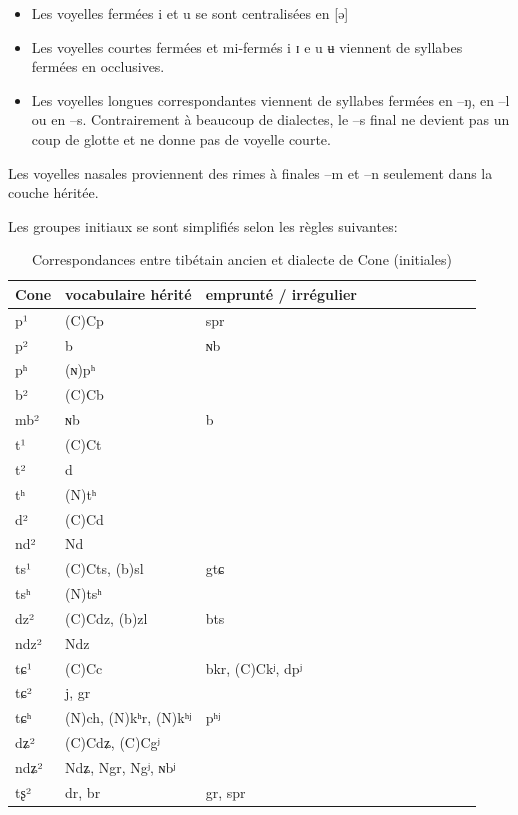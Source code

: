 \documentclass[oldfontcommands,oneside,a4paper,11pt]{memoir}
\begin{document}
\begin{itemize}
\item Les voyelles fermées i et u se sont centralisées en [ə]
\item Les voyelles courtes fermées et mi-fermés i ɪ e u ʉ viennent de syllabes fermées en occlusives. 
\item Les voyelles longues correspondantes viennent de syllabes fermées en --ŋ, en --l ou en --s. Contrairement à beaucoup de dialectes, le --s final ne devient pas un coup de glotte et ne donne pas de voyelle courte.
\end{itemize}
Les voyelles nasales proviennent des rimes à finales --m et --n seulement dans la couche héritée.

Les groupes initiaux se sont simplifiés selon les règles suivantes:

\begin{longtable}{l|llllllllll} 
\caption{Correspondances entre tibétain ancien et dialecte de Cone (initiales)}\label{tab:cone3} \\
\toprule
Cone  &  	vocabulaire hérité  &  	emprunté / irrégulier  \\  
\midrule
p¹  &  	(C)Cp  &  	spr  \\  
p²  &  	b  &  	ɴb  \\  
pʰ  &  	(ɴ)pʰ  &  	   \\  
b²  &  	(C)Cb  &  	   \\  
mb²  &  	ɴb  &  	b  \\  
t¹  &  	(C)Ct  &  	   \\  
t²  &  	d  &  	   \\  
tʰ  &  	(N)tʰ  &  	   \\  
d²  &  	(C)Cd  &  	   \\  
nd²  &  	Nd  &  	   \\  
ts¹  &  	(C)Cts, (b)sl  &  	gtɕ  \\  
tsʰ  &  	(N)tsʰ  &  	   \\  
dz²  &  	(C)Cdz, (b)zl  &  	bts  \\  
ndz²  &  	Ndz  &  	   \\  
tɕ¹  &  	(C)Cc  &  	bkr, (C)Ckʲ, dpʲ  \\  
tɕ²  &  	j, gr  &  	   \\  
tɕʰ  &  	(N)ch, (N)kʰr, (N)kʰʲ  &  	pʰʲ  \\  
dʑ²  &  	(C)Cdʑ, (C)Cgʲ &  	   \\  
ndʑ²  &  	Ndʑ, Ngr, Ngʲ, ɴbʲ  &  	   \\  
tʂ²  &  	dr, br  &  	gr, spr  \\  

\end{longtable}
\end{document}
